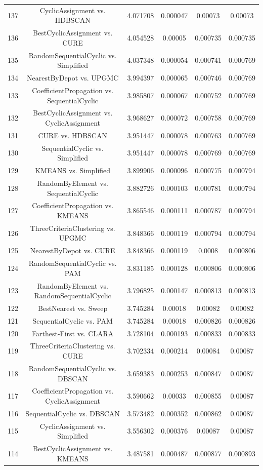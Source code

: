 \documentclass[a4paper,10pt]{article}
\begin{document}
\begin{landscape}
\begin{table}[!htp]
\begin{tabular}{cccccc}
137&CyclicAssignment vs. HDBSCAN&4.071708&0.000047&0.00073&0.00073\\
136&BestCyclicAssignment vs. CURE&4.054528&0.00005&0.000735&0.000735\\
135&RandomSequentialCyclic vs. Simplified&4.037348&0.000054&0.000741&0.000769\\
134&NearestByDepot vs. UPGMC&3.994397&0.000065&0.000746&0.000769\\
133&CoefficientPropagation vs. SequentialCyclic&3.985807&0.000067&0.000752&0.000769\\
132&BestCyclicAssignment vs. CyclicAssignment&3.968627&0.000072&0.000758&0.000769\\
131&CURE vs. HDBSCAN&3.951447&0.000078&0.000763&0.000769\\
130&SequentialCyclic vs. Simplified&3.951447&0.000078&0.000769&0.000769\\
129&KMEANS vs. Simplified&3.899906&0.000096&0.000775&0.000794\\
128&RandomByElement vs. SequentialCyclic&3.882726&0.000103&0.000781&0.000794\\
127&CoefficientPropagation vs. KMEANS&3.865546&0.000111&0.000787&0.000794\\
126&ThreeCriteriaClustering vs. UPGMC&3.848366&0.000119&0.000794&0.000794\\
125&NearestByDepot vs. CURE&3.848366&0.000119&0.0008&0.000806\\
124&RandomSequentialCyclic vs. PAM&3.831185&0.000128&0.000806&0.000806\\
123&RandomByElement vs. RandomSequentialCyclic&3.796825&0.000147&0.000813&0.000813\\
122&BestNearest vs. Sweep&3.745284&0.00018&0.00082&0.00082\\
121&SequentialCyclic vs. PAM&3.745284&0.00018&0.000826&0.000826\\
120&Farthest-First vs. CLARA&3.728104&0.000193&0.000833&0.000833\\
119&ThreeCriteriaClustering vs. CURE&3.702334&0.000214&0.00084&0.00087\\
118&RandomSequentialCyclic vs. DBSCAN&3.659383&0.000253&0.000847&0.00087\\
117&CoefficientPropagation vs. CyclicAssignment&3.590662&0.00033&0.000855&0.00087\\
116&SequentialCyclic vs. DBSCAN&3.573482&0.000352&0.000862&0.00087\\
115&CyclicAssignment vs. Simplified&3.556302&0.000376&0.00087&0.00087\\
114&BestCyclicAssignment vs. KMEANS&3.487581&0.000487&0.000877&0.000893\\

\end{tabular}
\end{table}
\end{landscape}
\end{document}
